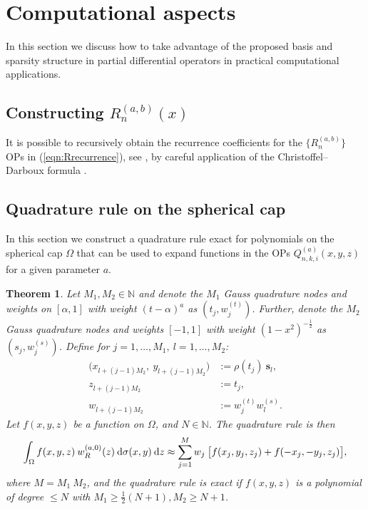 \documentclass[11pt, oneside]{article}   	%
\newcommand{\half}{\frac{1}{2}}
\newcommand{\N}{\mathbb{N}}
\newcommand{\genjac}{R}
\newcommand{\genjacw}{w_\genjac}
\newcommand{\scop}{Q}
\newcommand{\scopnki}{\scop_{n,k,i}}
\newcommand{\scopnkia}{\scopnki^{(a)}}
\newtheorem{theorem}{Theorem}
\begin{document}
%
\section{Computational aspects}\label{Section:Computation}

In this section we discuss how to take advantage of the proposed basis and sparsity structure in partial differential operators in practical computational applications.


\subsection{Constructing $\genjac_n^{(a,b)}(x)$}

It is possible to recursively obtain the recurrence coefficients for the $\{\genjac_n^{(a,b)}\}$ OPs in (\ref{eqn:Rrecurrence}), see \cite{snowball2019sparse}, by careful application of the Christoffel--Darboux formula \cite[18.2.12]{DLMF}.


\subsection{Quadrature rule on the spherical cap}\label{subsection:quadrule}

In this section we construct a quadrature rule exact for polynomials on the spherical cap $\Omega$ that can be used to expand functions in the OPs $\scopnkia(x,y,z)$ for a given parameter $a$.

\begin{theorem}\label{Theorem:quadrule}
Let $M_1, M_2 \in \N$ and denote the $M_1$ Gauss quadrature nodes and weights on $[\alpha,1]$ with weight $(t - \alpha)^a$ as $(t_j, w_j^{(t)})$. Further, denote the $M_2$ Gauss quadrature nodes and weights $[-1,1]$ with weight $(1 - x^2)^{-\half}$ as $(s_j, w_j^{(s)})$.
Define for $j = 1,\dots,M_1, \: l=1,\dots,M_2$:
\begin{align*}
	\big(x_{l+(j-1)M_2}, \: y_{l+(j-1)M_2} \big) &:= \rho(t_j) \: \mathbf{s}_l, \\
	z_{l+(j-1)M_2} &:= t_j, \\
	w_{l+(j-1)M_2} &:= w_j^{(t)} w_l^{(s)}.
\end{align*}
Let $f(x,y,z)$ be a function on $\Omega$, and $N \in \N$. The quadrature rule is then
\begin{align*}
	\int_\Omega f(x,y,z) \: \genjacw^{(a,0)}(z) \: \D \sigma(x,y) \: \D z \approx \sum_{j=1}^{M} w_j \: \big[ f(x_j, y_j, z_j) + f(-x_j, -y_j, z_j) \big],
\end{align*}
where $M = M_1 \: M_2$, and the quadrature rule is exact if $f(x,y,z)$ is a polynomial of degree $\le N$ with $M_1 \ge \half (N+1), M_2 \ge N+1$.
\end{theorem}
\end{document}
